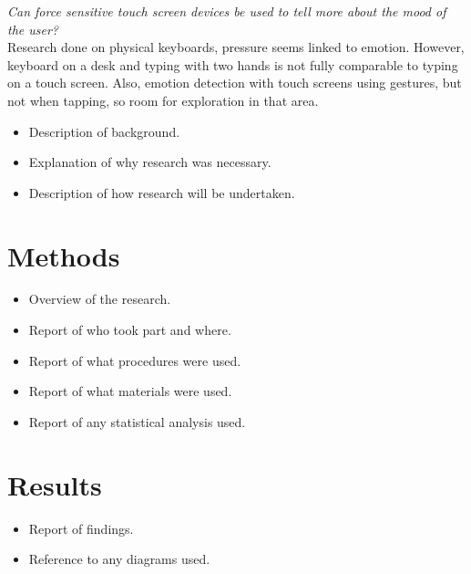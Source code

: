 \documentclass{sig-alternate}
\begin{document}
\textit{Can force sensitive touch screen devices be used to tell more about the mood of the user?}\\

Research done on physical keyboards, pressure seems linked to emotion. However, keyboard on a desk and typing with two hands is not fully comparable to typing on a touch screen. Also, emotion detection with touch screens using gestures, but not when tapping, so room for exploration in that area.


\begin{itemize}
	\item Description of background.
	\item Explanation of why research was necessary.
	\item Description of how research will be undertaken.
\end{itemize}




\section{Methods} %
\label{sec:methods}
\begin{itemize}
	\item Overview of the research.
	\item Report of who took part and where.
	\item Report of what procedures were used.
	\item Report of what materials were used.
	\item Report of any statistical analysis used.
\end{itemize}


\section{Results} %
\label{sec:results}
\begin{itemize}
	\item Report of findings.
	\item Reference to any diagrams used.
\end{itemize}
\end{document}
